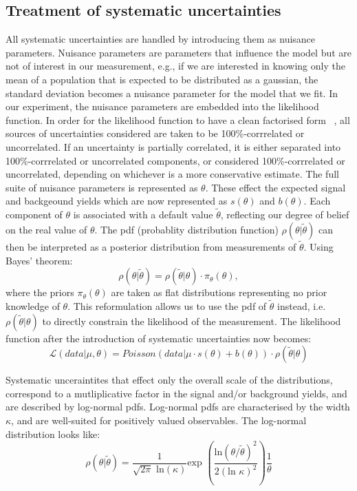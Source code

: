 \subsection{Treatment of systematic uncertainties}
\label{sys_treat}
All systematic uncertainties are handled by introducing them as nuisance parameters. Nuisance parameters are parameters that influence the model but are not of interest in our measurement, e.g., if we are interested in knowing only the mean of a population that is expected to be distributed as a gaussian, the standard deviation becomes a nuisance parameter for the model that we fit. In our experiment, the nuisance parameters are embedded into the likelihood function. In order for the likelihood function to have a clean factorised form ~\cite{note2011}, all sources of uncertainties considered are taken to be 100\%-corrrelated or uncorrelated. If an uncertainty is partially correlated, it is either separated into 100\%-corrrelated or uncorrelated components, or considered 100\%-corrrelated or uncorrelated, depending on whichever is a more conservative estimate. The full suite of nuisance parameters is represented as $\theta$. These effect the expected signal and backgeound yields which are now represented as $s(\theta)$ and $b(\theta)$. Each component of $\theta$ is associated with a default value $\tilde{\theta}$, reflecting our degree of belief on the real value of $\theta$. The pdf (probablity distribution function) $\rho(\theta|\tilde{\theta})$ can then be interpreted as a posterior distribution from measurements of $\tilde{\theta}$. Using Bayes' theorem:
\begin{equation}
  \rho(\theta|\tilde{\theta})=\rho(\tilde{\theta}|\theta)\cdot\pi_\theta(\theta),
\end{equation}
where the priors $\pi_\theta(\theta)$ are taken as flat distributions representing no prior knowledge of $\theta$. This reformulation allows us to use the pdf of $\tilde{\theta}$ instead, i.e. $\rho(\tilde{\theta}|\theta)$  to directly constrain the likelihood of the measurement. The likelihood function after the introduction of systematic uncertainties now becomes:
\begin{equation}
  \mathcal{L}(data|\mu,\theta)=Poisson(data|\mu\cdot s(\theta) + b(\theta))\cdot\rho(\tilde{\theta}|\theta)
\end{equation}

Systematic unceraintites that effect only the overall scale of the distributions, correspond to a mutliplicative factor in the signal and/or background yields, and are described by log-normal pdfs. Log-normal pdfs are characterised by the width $\kappa$, and are well-suited for positively valued observables. The log-normal distribution looks like:
\begin{equation}
\rho(\theta|\tilde{\theta})=\frac{1}{\sqrt{2\pi}\text{ ln}(\kappa)}\text{exp }(\frac{\text{ln}(\theta/\tilde{\theta})^2}{2(\text{ln }\kappa)^2}) \frac{1}{\theta}  
\end{equation}

